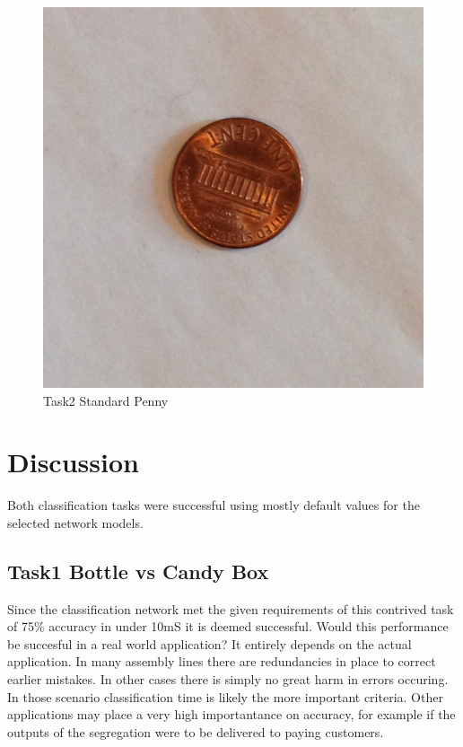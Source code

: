\documentclass[10pt,journal,compsoc]{IEEEtran}
\begin{document}
\begin{figure}[h]
      \centering
      \includegraphics[width=\linewidth]{Assets/testset2_10/report/IMG_2835.JPG}
      \caption{Task2 Standard Penny }
      \label{fig:Task2 Standard Penny}
\end{figure}




\section{Discussion}
Both classification tasks were successful using mostly default values for the selected network models.

\subsection{Task1 Bottle vs Candy Box}
Since the classification network met the given requirements of this contrived task of 75\% accuracy in under 10mS it is deemed successful. Would this performance be succesful in a real world application? It entirely depends on the actual application. In many assembly lines there  are redundancies in place to correct earlier mistakes. In other cases there is simply no great harm in errors occuring. In those scenario classification time is likely the more important criteria. Other applications may place a very high importantance on accuracy, for example if the outputs of the segregation were to be delivered to paying customers.
\end{document}
